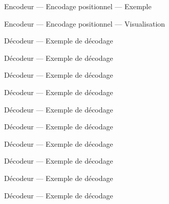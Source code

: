 \begin{frame}{Encodeur --- Encodage positionnel --- Exemple}
\end{frame}

\begin{frame}{Encodeur --- Encodage positionnel --- Visualisation}
\end{frame}

\begin{frame}{Décodeur --- Exemple de décodage}
\end{frame}

\begin{frame}{Décodeur --- Exemple de décodage}
\end{frame}

\begin{frame}{Décodeur --- Exemple de décodage}
\end{frame}

\begin{frame}{Décodeur --- Exemple de décodage}
\end{frame}

\begin{frame}{Décodeur --- Exemple de décodage}
\end{frame}

\begin{frame}{Décodeur --- Exemple de décodage}
\end{frame}

\begin{frame}{Décodeur --- Exemple de décodage}
\end{frame}

\begin{frame}{Décodeur --- Exemple de décodage}
\end{frame}

\begin{frame}{Décodeur --- Exemple de décodage}
\end{frame}

\begin{frame}{Décodeur --- Exemple de décodage}
\end{frame}

